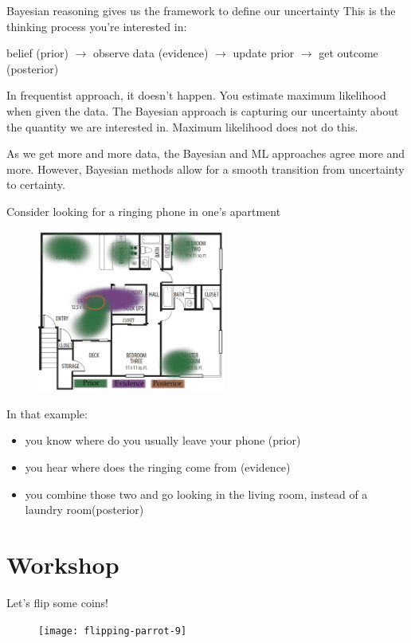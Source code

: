 \documentclass[pdf,dvipsnames]{beamer}
\begin{document}
\begin{frame}{Bayesian reasoning gives us the framework to define our uncertainty}
	This is the thinking process you're interested in:
	
	
	belief (prior) $\longrightarrow$ observe data (evidence) $\longrightarrow$ update prior $\longrightarrow$ get outcome (posterior)
	

	In frequentist approach, it doesn’t happen. You estimate maximum likelihood when given the data. The Bayesian approach is capturing our uncertainty about the quantity we are interested in. Maximum likelihood does not do this.


	As we get more and more data, the Bayesian and ML approaches agree more and more. However, Bayesian methods allow for a smooth transition from uncertainty to certainty.
\end{frame}

\begin{frame}{Consider looking for a ringing phone in one's apartment}
  \begin{figure}
    \includegraphics[width=0.55\textwidth,keepaspectratio]{apartment-plan}
	\end{figure}
  In that example:
  \begin{itemize}
  	\item you know where do you usually leave your phone (prior)
  	\item you hear where does the ringing come from (evidence)
  	\item you combine those two and go looking in the living room, instead of a laundry room\footnotemark (posterior)
  \end{itemize}
\end{frame}

\section{Workshop}

\begin{frame}{Let's flip some coins!}
	\begin{figure}
		\texttt{[image: flipping-parrot-9]}
	\end{figure}
\end{frame}
\end{document}
